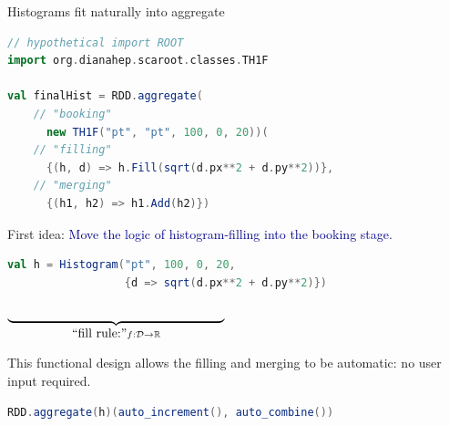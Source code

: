 \documentclass{beamer}
\begin{document}
\begin{frame}[fragile]{Histograms fit naturally into aggregate}

\begin{lstlisting}[language=scala]
// hypothetical import ROOT
import org.dianahep.scaroot.classes.TH1F

val finalHist = RDD.aggregate(
    // "booking"
      new TH1F("pt", "pt", 100, 0, 20))(
    // "filling"
      {(h, d) => h.Fill(sqrt(d.px**2 + d.py**2))},
    // "merging"
      {(h1, h2) => h1.Add(h2)})
\end{lstlisting}

\end{frame}

\begin{frame}[fragile]{First idea:}
\textcolor{darkblue}{\large Move the logic of histogram-filling into the booking stage.}

\begin{lstlisting}[language=scala]
val h = Histogram("pt", 100, 0, 20,
                  {d => sqrt(d.px**2 + d.py**2)})
\end{lstlisting}

\vspace{-\baselineskip} \hfill $\underbrace{\mbox{\hspace{6.0 cm}}}_{\mbox{``fill rule:''} f: \mathcal{D} \to \mathbb{R}}$ \hspace{0.7 cm}

\vfill
This functional design allows the filling and merging to be automatic: no user input required.

\begin{lstlisting}[language=scala]
RDD.aggregate(h)(auto_increment(), auto_combine())
\end{lstlisting}
\end{frame}
\end{document}
